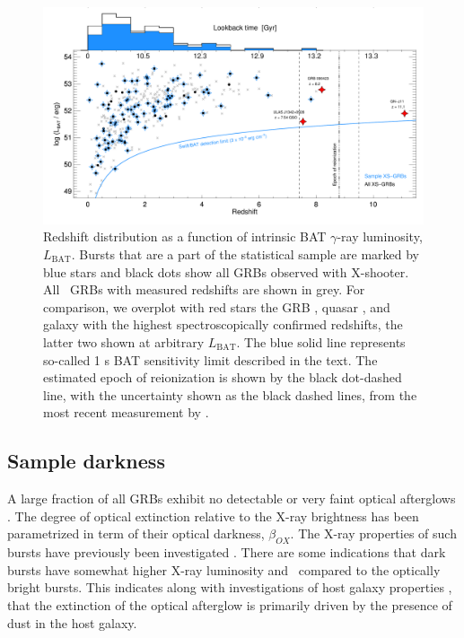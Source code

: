 \documentclass{aa}    %
\begin{document}
\begin{figure}
	\centering \includegraphics[width=16cm]{figures/XSGRB_redshift_swiftdots.pdf}
\caption{Redshift distribution as a function of intrinsic BAT $\gamma$-ray
	luminosity, $L_{\mathrm{BAT}}$. Bursts that are a part of the statistical
	sample are marked by blue stars and black dots show all GRBs observed with
	X-shooter. All \swift~GRBs with measured redshifts are shown in grey. For
	comparison, we overplot with red stars the GRB \citep{Tanvir2009b,
		Salvaterra2009a}, quasar \citep{Banados2017}, and galaxy \citep{Oesch2016} with
	the highest spectroscopically confirmed redshifts, the latter two shown at
	arbitrary $L_{\mathrm{BAT}}$. The blue solid line represents so-called 1 s BAT
	sensitivity limit described in the text. The estimated epoch of reionization is
	shown by the black dot-dashed line, with the uncertainty shown as the black
	dashed lines, from the most recent measurement by \citet{Planck2015}.}
\label{fig:z}
\end{figure}



\subsection{Sample darkness} \label{darkness}

A large fraction of all GRBs exhibit no detectable or very faint optical
afterglows \citep{Groot1998, Djorgovski2001, Fynbo2001}. The degree of optical
extinction relative to the X-ray brightness has been parametrized in term of
their optical darkness,  $\beta_{OX}$\citep{Jakobsson2004, Rol2005,
	VanderHorst2009}. The X-ray properties of such bursts have previously been
investigated \citep{DePasquale2003, Fynbo2009, Melandri2012}. There are some
indications that dark bursts have somewhat higher X-ray luminosity and
\nhx~compared to the optically bright bursts. This indicates along with
investigations of host galaxy properties \citep{Greiner2011, Kruhler2011,
	Hjorth2012, Perley2016b}, that the extinction of the optical afterglow is
primarily driven by the presence of dust in the host galaxy.
\end{document}
